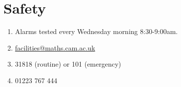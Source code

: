 \chapter{Safety}
\label{cha:safety}

\begin{enumerate}
\item Alarms tested every Wednesday morning 8:30-9:00am.
\item \url{facilities@maths.cam.ac.uk}
\item 31818 (routine) or 101 (emergency)
\item 01223 767 444
\end{enumerate}

